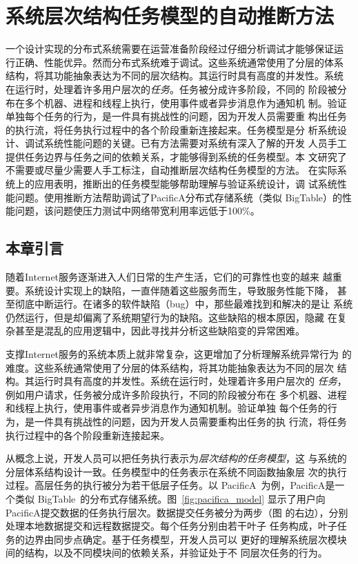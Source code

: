\chapter{系统层次结构任务模型的自动推断方法}
\label{chap:scalpel}

一个设计实现的分布式系统需要在运营准备阶段经过仔细分析调试才能够保证运
行正确、性能优异。然而分布式系统难于调试。这些系统通常使用了分层的体系
结构，将其功能抽象表达为不同的层次结构。其运行时具有高度的并发性。系统
在运行时，处理着许多用户层次的\emph{任务}。任务被分成许多阶段，不同的
阶段被分布在多个机器、进程和线程上执行，使用事件或者异步消息作为通知机
制。验证单独每个任务的行为，是一件具有挑战性的问题，因为开发人员需要重
构出任务的执行流，将任务执行过程中的各个阶段重新连接起来。任务模型是分
析系统设计、调试系统性能问题的关键。已有方法需要对系统有深入了解的开发
人员手工提供任务边界与任务之间的依赖关系，才能够得到系统的任务模型。本
文研究了不需要或尽量少需要人手工标注，自动推断层次结构任务模型的方法。
在实际系统上的应用表明，推断出的任务模型能够帮助理解与验证系统设计，调
试系统性能问题。使用推断方法帮助调试了PacificA分布式存储系统（类似
BigTable）的性能问题，该问题使压力测试中网络带宽利用率远低于100\%。

\section{本章引言}

随着Internet服务逐渐进入人们日常的生产生活，它们的可靠性也变的越来
越重要。系统设计实现上的缺陷，一直伴随着这些服务而生，导致服务性能下降，
甚至彻底中断运行。在诸多的软件缺陷（bug）中，那些最难找到和解决的是让
系统仍然运行，但是却偏离了系统期望行为的缺陷。这些缺陷的根本原因，隐藏
在复杂甚至是混乱的应用逻辑中，因此寻找并分析这些缺陷变的异常困难。

支撑Internet服务的系统本质上就非常复杂，这更增加了分析理解系统异常行为
的难度。这些系统通常使用了分层的体系结构，将其功能抽象表达为不同的层次
结构。其运行时具有高度的并发性。系统在运行时，处理着许多用户层次的
\emph{任务}，例如用户请求，任务被分成许多阶段执行，不同的阶段被分布在
多个机器、进程和线程上执行，使用事件或者异步消息作为通知机制。验证单独
每个任务的行为，是一件具有挑战性的问题，因为开发人员需要重构出任务的执
行流，将任务执行过程中的各个阶段重新连接起来。

从概念上说，开发人员可以把任务执行表示为\emph{层次结构的任务模型}，这
与系统的分层体系结构设计一致。任务模型中的任务表示在系统不同函数抽象层
次的执行过程。高层任务的执行被分为若干低层子任务。以
PacificA~\cite{pacifica}为例，PacificA是一个类似
BigTable~\cite{bigtable}的分布式存储系统。图~\ref{fig:pacifica_model}
显示了用户向PacificA提交数据的任务执行层次。数据提交任务被分为两步（图
的右边），分别处理本地数据提交和远程数据提交。每个任务分别由若干{叶子
任务}构成，叶子任务的边界由{同步点}确定。基于任务模型，开发人员可以
更好的理解系统层次模块间的结构，以及不同模块间的依赖关系，并验证处于不
同层次任务的行为。

